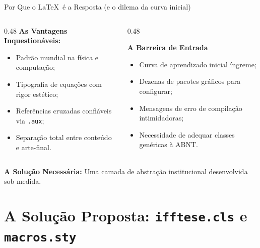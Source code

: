 \documentclass[aspectratio=169, 10pt]{beamer}
\begin{document}
\begin{frame}{Por Que o \LaTeX\ é a Resposta (e o dilema da curva inicial)}
  \begin{columns}[T]
    \begin{column}{0.48\textwidth}
      \textbf{As Vantagens Inquestionáveis:}
      \begin{itemize}\setlength{\itemsep}{2pt}
        \item Padrão mundial na física e computação;
        \item Tipografia de equações com rigor estético;
        \item Referências cruzadas confiáveis via \texttt{.aux};
        \item Separação total entre conteúdo e arte-final.
      \end{itemize}
    \end{column}

    \begin{column}{0.48\textwidth}
      \begin{alertblock}{\textbf{A Barreira de Entrada}}
        \scriptsize
        \begin{itemize}\setlength{\itemsep}{2pt}
          \item Curva de aprendizado inicial íngreme;
          \item Dezenas de pacotes gráficos para configurar;
          \item Mensagens de erro de compilação intimidadoras;
          \item Necessidade de adequar classes genéricas à ABNT.
        \end{itemize}
      \end{alertblock}
    \end{column}
  \end{columns}
  \vspace{0.10cm}
  \centering \scriptsize \textbf{A Solução Necessária:} Uma camada de abstração institucional desenvolvida sob medida.
\end{frame}

\section{A Solução Proposta: \texttt{ifftese.cls} e \texttt{macros.sty}}
\end{document}
